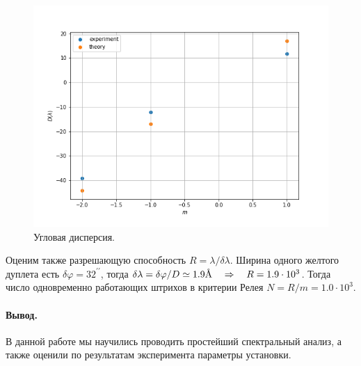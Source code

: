 \documentclass{../lab_class}
\newcommand{\angstrom}{\text{\normalfont\AA}}
\begin{document}
\begin{figure}[H]
	\centering
	\includegraphics[width=12cm]{fig2.png}
	\caption{Угловая дисперсия.}
	\label{fig:results2}
\end{figure}

Оценим также разрешающую способность $R = \lambda / \delta \lambda$. Ширина одного желтого дуплета есть $\delta \varphi = 32^{\prime \prime}$, тогда $\delta \lambda = \delta \varphi / D \simeq 1.9 \angstrom \then R = 1.9 \cdot 10^3$. Тогда число одновременно работающих штрихов в критерии Релея $N = R/m = 1.0 \cdot 10^3$. 

\paragraph{Вывод.}
В данной работе мы научились проводить простейший спектральный анализ, а также оценили по результатам эксперимента параметры установки.
\end{document}
